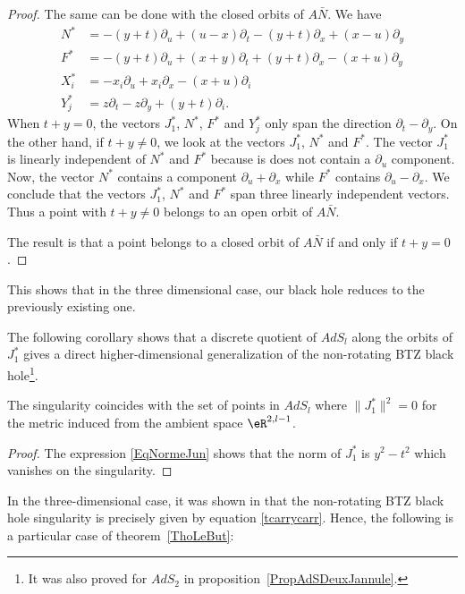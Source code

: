 \begin{proof}
The same can be done with the closed orbits of $A\bar{N}$. We have
\begin{subequations}
\begin{align}
	N^*	&=	-(y+t)\partial_u+(u-x)\partial_t-(y+t)\partial_x+(x-u)\partial_y\\
	F^*	&=	-(y+t)\partial_u+(x+y)\partial_t+(y+t)\partial_x-(x+u)\partial_y\\
	X^*_i	&=	-x_i\partial_u+x_i\partial_x-(x+u)\partial_i\\
	Y_j^*	&=	z\partial_t-z\partial_y+(y+t)\partial_i.
\end{align}
\end{subequations}
When $t+y=0$, the vectors $J_1^*$, $N^*$, $F^*$ and $Y_j^*$ only span the direction $\partial_t-\partial_y$. On the other hand, if $t+y\neq 0$, we look at the vectors $J_1^*$, $N^*$ and $F^*$. The vector $J_1^*$ is linearly independent of $N^*$ and $F^*$ because is does not contain a $\partial_u$ component. Now, the vector $N^*$ contains a component $\partial_u+\partial_x$ while $F^*$ contains $\partial_u-\partial_x$. We conclude that the vectors $J_1^*$, $N^*$ and $F^*$ span three linearly independent vectors. Thus a point with $t+y\neq 0$ belongs to an open orbit of $A\bar N$.

The result is that a point belongs to a closed orbit of $A\bar{N}$ if and only if $t+y=0$.
\end{proof}
This shows that in the three dimensional case, our black hole reduces to the previously existing one.

The following corollary shows that a discrete quotient of $AdS_l$ along the orbits of $J_1^*$ gives a direct higher-dimensional generalization of the non-rotating BTZ black hole\footnote{It was also proved for \( AdS_2\) in proposition~\ref{PropAdSDeuxJannule}.}.
\begin{corollary} \label{CorJannsingul}
The singularity coincides with the set of points in $AdS_l$ where $\| J_1^* \|^2 = 0$ for the metric induced from the ambient space $\eR^{2,l-1}$.
\end{corollary}

\begin{proof}
    The expression \eqref{EqNormeJun} shows that the norm of $J_1^* $ is $y^2-t^2$ which vanishes on the singularity.
\end{proof}

In the three-dimensional case, it was shown in \cite{BTZ_deux,BTZB_un} that the non-rotating BTZ black hole singularity is precisely given by equation \eqref{tcarrycarr}. Hence, the following is a particular case of theorem~\ref{ThoLeBut}:

